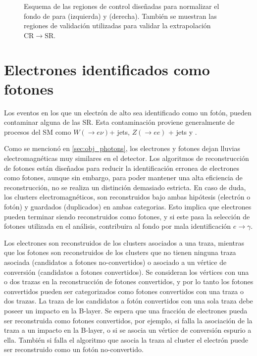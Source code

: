 \begin{figure}[!htbp]
  \centering

  \resizebox{0.49\textwidth}{!}{}
  \resizebox{0.49\textwidth}{!}{}

  \caption{Esquema de las regiones de control diseñadas para normalizar el fondo
    de {\gjet} para {\SRL} (izquierda) y {\SRH} (derecha). También se muestran
    las regiones de validación utilizadas para validar la extrapolación
    $\mathrm{CR}\to\mathrm{SR}$.}
  \label{fig:bkg_crq}
\end{figure}



\section{Electrones identificados como fotones} \label{sec:efakes}

Los eventos en los que un electrón de alto {\pt} sea identificado como un 
fotón, pueden contaminar alguna de las SR. Esta contaminación
proviene generalmente de procesos del SM como $W(\to e\nu)$+ jets, $Z(\to ee)$ +
jets y {\ttbar}.

Como se mencionó en \cref{sec:obj_photons}, los electrones y fotones dejan
lluvias electromagnéticas muy similares en el detector. Los algoritmos de
reconstrucción de fotones están diseñados para reducir la identificación erronea
de electrones como fotones, aunque sin embargo, para poder mantener una alta
eficiencia de reconstrucción, no se realiza un distinción demasiado estricta. En
caso de duda, los clusters electromagnéticos, son reconstruidos bajo ambas
hipótesis (electrón o fotón) y guardados (duplicados) en ambas categorias. Esto
implica que electrones pueden terminar siendo reconstruidos como fotones, y si este
pasa la selección de fotones utilizada en el
análisis, contribuira al fondo por mala identificación $e\to\gamma$.


Los electrones son reconstruidos de los clusters asociados a una traza, mientras
que los fotones son reconstruidos de los clusters que no tienen ninguna traza
asociada (candidatos a fotones no-convertidos) o asociado a un vértice de
conversión (candidatos a fotones convertidos). Se consideran los vértices con
una o dos trazas en la reconstrucción de fotones convertidos, y por lo tanto los
fotones convertidos pueden ser categorizados como fotones convertidos con una
traza o dos trazas. La traza de los candidatos a fotón convertidos con una sola
traza debe poseer un impacto en la B-layer. Se espera que una fracción de
electrones pueda ser reconstruida como fotones convertidos, por ejemplo, si
falla la asociación de la traza a un impacto en la B-layer, o si se asocia un
vértice de conversión espurio a ella. También si falla el algoritmo que asocia
la traza al cluster el electrón puede ser reconstruido como un fotón
no-convertido.

